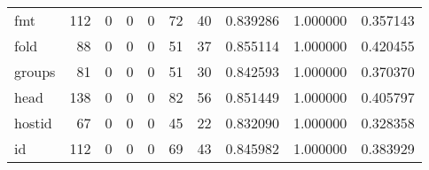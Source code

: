 \begin{longtable}{lrrrrrrrrr}
fmt       &                                   112 &                                                  0 &                                                  0 &                                                  0 &                                                 72 &                                                 40 &                                           0.839286 &                               1.000000 &                             0.357143 \\
fold      &                                    88 &                                                  0 &                                                  0 &                                                  0 &                                                 51 &                                                 37 &                                           0.855114 &                               1.000000 &                             0.420455 \\
groups    &                                    81 &                                                  0 &                                                  0 &                                                  0 &                                                 51 &                                                 30 &                                           0.842593 &                               1.000000 &                             0.370370 \\
head      &                                   138 &                                                  0 &                                                  0 &                                                  0 &                                                 82 &                                                 56 &                                           0.851449 &                               1.000000 &                             0.405797 \\
hostid    &                                    67 &                                                  0 &                                                  0 &                                                  0 &                                                 45 &                                                 22 &                                           0.832090 &                               1.000000 &                             0.328358 \\
id        &                                   112 &                                                  0 &                                                  0 &                                                  0 &                                                 69 &                                                 43 &                                           0.845982 &                               1.000000 &                             0.383929 \\

\end{longtable}
